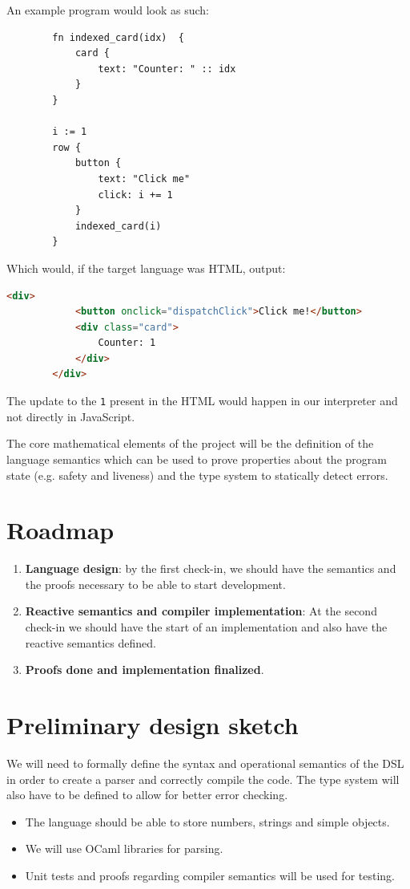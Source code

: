\noindent An example program would look as such:
\begin{center}
	\begin{lstlisting}
		fn indexed_card(idx)  {
			card {
				text: "Counter: " :: idx
			}
		}
		
		i := 1
		row {
			button {
				text: "Click me"
				click: i += 1
			}
			indexed_card(i)
		}
	\end{lstlisting}
\end{center}

Which would, if the target language was HTML, output:
\begin{center}
	\begin{lstlisting}[language=html]
		<div>
			<button onclick="dispatchClick">Click me!</button>
			<div class="card">
				Counter: 1
			</div>
		</div>
	\end{lstlisting}
\end{center}

The update to the \lstinline|1| present in the HTML would happen in our interpreter and not directly in JavaScript.

The core mathematical elements of the project will be the definition of the language semantics which can be used to prove properties about the program state (e.g. safety and liveness) and the type system to statically detect errors.

\section{Roadmap}
\begin{enumerate}
	\item \textbf{Language design}: by the first check-in, we should have the semantics and the proofs necessary to be able to start development.
	\item \textbf{Reactive semantics and compiler implementation}: At the second check-in we should have the start of an implementation and also have the reactive semantics defined.
	\item \textbf{Proofs done and implementation finalized}.
\end{enumerate}

\section{Preliminary design sketch}
We will need to formally define the syntax and operational semantics of the DSL in order to create a parser and correctly compile the code. The type system will also have to be defined to allow for better error checking.

\begin{itemize}
	\item The language should be able to store numbers, strings and simple objects.
	\item We will use OCaml libraries for parsing.
	\item Unit tests and proofs regarding compiler semantics will be used for testing.
\end{itemize}